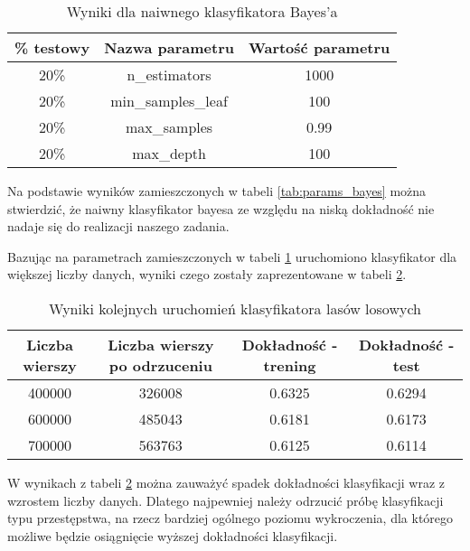 \documentclass{classrep}
\begin{document}
{{{            \begin{table}[!htbp]
                \begin{tabular}{|c|c|c|}
                    \hline
                    \% testowy & Nazwa parametru & Wartość parametru \\ \hline
20\% & n\_estimators & 1000 \\ \hline
20\% & min\_samples\_leaf & 100 \\ \hline
20\% & max\_samples & 0.99 \\ \hline
20\% & max\_depth & 100 \\ \hline
                \end{tabular}
                \caption{Wyniki dla naiwnego klasyfikatora Bayes'a}
                \label{tab:params_forest_final}
            \end{table}
            \FloatBarrier
            
            Na podstawie wyników zamieszczonych w tabeli \ref{tab:params_bayes} można stwierdzić, że naiwny klasyfikator bayesa ze względu na niską dokładność nie nadaje się do realizacji naszego zadania.
            
            Bazując na parametrach zamieszczonych w tabeli \ref{tab:params_forest_final} uruchomiono klasyfikator dla większej liczby danych, wyniki czego zostały zaprezentowane w tabeli \ref{tab:forest_exec}.
            \begin{table}[!htbp]
                \begin{tabular}{|c|c|c|c|}
                    \hline
                    Liczba wierszy & Liczba wierszy po odrzuceniu & Dokładność - trening & Dokładność - test \\ \hline
400000 & 326008 & 0.6325 & 0.6294 \\ \hline
600000 & 485043 & 0.6181 & 0.6173 \\ \hline
700000 & 563763 & 0.6125 & 0.6114 \\ \hline
                \end{tabular}
                \caption{Wyniki kolejnych uruchomień klasyfikatora lasów losowych}
                \label{tab:forest_exec}
            \end{table}
            \FloatBarrier
            W wynikach z tabeli \ref{tab:forest_exec} można zauważyć spadek dokładności klasyfikacji wraz z wzrostem liczby danych. Dlatego najpewniej należy odrzucić próbę klasyfikacji typu przestępstwa, na rzecz bardziej ogólnego poziomu wykroczenia, dla którego możliwe będzie osiągnięcie wyższej dokładności klasyfikacji.
            }
        }

}
\end{document}
